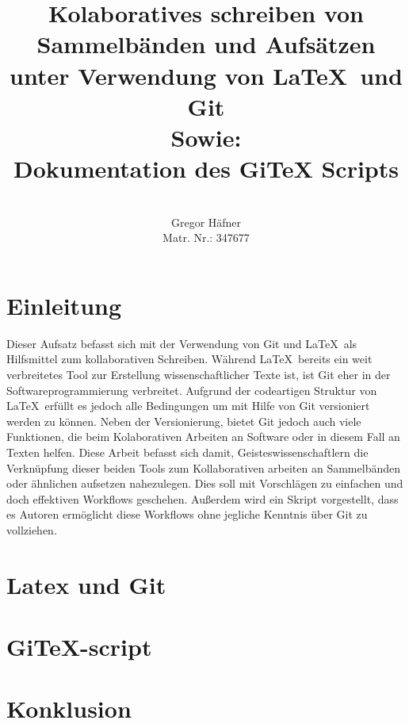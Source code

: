 \documentclass[12pt,a4paper]{scrartcl}
\author{\\ Gregor Häfner \\
{\small Matr. Nr.: 347677} }
\title{Kolaboratives schreiben von Sammelbänden und Aufsätzen unter Verwendung von \LaTeX ~und Git \bigskip \\ Sowie: \\ Dokumentation des GiTeX Scripts}
\begin{document}
\maketitle
\bigskip
\tableofcontents
\pagebreak

\section{Einleitung}

Dieser Aufsatz befasst sich mit der Verwendung von Git und \LaTeX \ als Hilfsmittel zum kollaborativen Schreiben. Während \LaTeX \ bereits ein weit verbreitetes Tool zur Erstellung wissenschaftlicher Texte ist, ist Git eher in der Softwareprogrammierung verbreitet. Aufgrund der codeartigen Struktur von \LaTeX \ erfüllt es jedoch alle Bedingungen um mit Hilfe von Git versioniert werden zu können. Neben der Versionierung, bietet Git jedoch auch viele Funktionen, die beim Kolaborativen Arbeiten an Software oder in diesem Fall an Texten helfen. Diese Arbeit befasst sich damit, Geisteswissenschaftlern die Verknüpfung dieser beiden Tools zum Kollaborativen arbeiten an Sammelbänden oder ähnlichen aufsetzen nahezulegen. Dies soll mit Vorschlägen zu einfachen und doch effektiven Workflows geschehen. Außerdem wird ein Skript vorgestellt, dass es Autoren ermöglicht diese Workflows ohne jegliche Kenntnis über Git zu vollziehen.

\section{Latex und Git}



\section{GiTeX-script}



\section{Konklusion}
\end{document}
